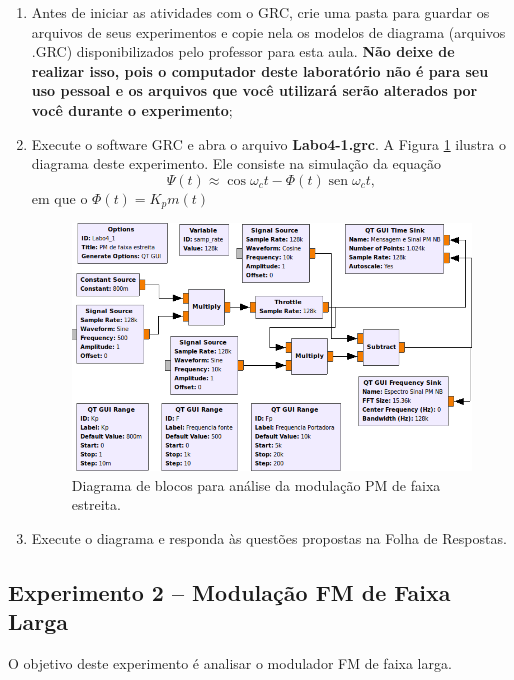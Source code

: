 \documentclass[12pt,addpoints]{exam}
\begin{document}
\begin{enumerate}
    \item Antes de iniciar as atividades com o GRC, crie uma pasta para guardar os arquivos de seus experimentos e copie nela os modelos de diagrama (arquivos .GRC) disponibilizados pelo professor para esta aula. \textbf{Não deixe de realizar isso, pois o computador deste laboratório não é para seu uso pessoal e os arquivos que você utilizará serão alterados por você durante o experimento};
    \item Execute o software GRC e abra o arquivo \textbf{Labo4-1.grc}. A Figura \ref{fig:GRC_4-1} ilustra o diagrama deste experimento. Ele consiste na simulação da equação 
\begin{equation}
    \varPsi(t) \approx \cos\omega_ct - \Phi(t)\operatorname{sen}{\omega_{c}t}, \label{eq:pmnb}
\end{equation}
em que o $\Phi(t) = K_pm(t)$
    \begin{figure}[htb]
        \centering
        \includegraphics[scale=.5]{./Figuras/Labo4-1}
        \caption{Diagrama de blocos para análise da modulação PM de faixa estreita.} 
        \label{fig:GRC_4-1}
    \end{figure}
  \item Execute o diagrama e responda às questões propostas na Folha de Respostas.
\end{enumerate}

\subsection{Experimento 2 -- Modulação FM de Faixa Larga}

O objetivo deste experimento é analisar o modulador FM de faixa larga. 
\end{document}

